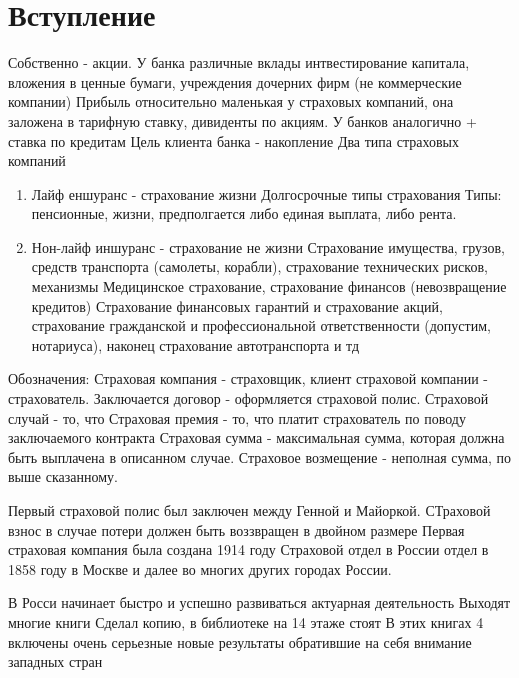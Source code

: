 \documentclass[10pt]{article}
\theoremstyle{theorem}
\begin{document}
    \section{Вступление}
    Собственно - акции. У банка различные вклады
    интвестирование капитала, вложения в ценные бумаги, учреждения дочерних фирм (не коммерческие компании)
    Прибыль относительно маленькая у страховых компаний, она заложена в тарифную ставку,
    дивиденты по акциям. У банков аналогично + ставка по кредитам
    Цель клиента банка - накопление
    Два типа страховых компаний
    \begin{enumerate}
        \item Лайф еншуранс - страхование жизни
            Долгосрочные типы страхования
            Типы: пенсионные, жизни, 
            предполгается либо единая выплата, либо рента.
        \item Нон-лайф иншуранс - страхование не жизни
            Страхование имущества, грузов, средств транспорта (самолеты, корабли),
            страхование технических рисков, механизмы
            Медицинское страхование, страхование финансов (невозвращение кредитов)
            Страхование финансовых гарантий и страхование акций, страхование гражданской и 
            профессиональной ответственности (допустим, нотариуса), наконец страхование автотранспорта и тд
        \end{enumerate}
    Обозначения:
    Страховая компания - страховщик, клиент страховой компании - страхователь.
    Заключается договор - оформляется страховой полис.
    Страховой случай - то, что 
    Страховая премия - то, что платит страхователь по поводу заключаемого контракта
    Страховая сумма - максимальная сумма, которая должна быть выплачена в описанном случае.
    Страховое возмещение - неполная сумма, по выше сказанному.

    Первый страховой полис был заключен между Генной и Майоркой.
    СТраховой взнос в случае потери должен быть воззвращен в двойном размере
    Первая страховая компания была создана 1914 году
    Страховой отдел в России отдел в 1858 году в Москве и далее во многих других городах России.

    В Росси начинает быстро и успешно развиваться актуарная деятельность
    Выходят многие книги
    Сделал копию, в библиотеке на 14 этаже стоят 
    В этих книгах 4 включены очень серьезные новые результаты
    обратившие на себя внимание западных стран
\end{document}

